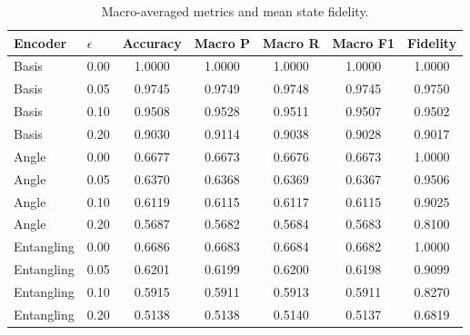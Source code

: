 \begin{table}[htbp]
\centering
\small
\caption{Macro-averaged metrics and mean state fidelity.}
\label{tab:macro}
\begin{tabular}{llccccc}
\toprule
Encoder & $\epsilon$ & Accuracy & Macro P & Macro R & Macro F1 & Fidelity \\
\midrule
Basis & 0.00 & 1.0000 & 1.0000 & 1.0000 & 1.0000 & 1.0000 \\
Basis & 0.05 & 0.9745 & 0.9749 & 0.9748 & 0.9745 & 0.9750 \\
Basis & 0.10 & 0.9508 & 0.9528 & 0.9511 & 0.9507 & 0.9502 \\
Basis & 0.20 & 0.9030 & 0.9114 & 0.9038 & 0.9028 & 0.9017 \\
\midrule
Angle & 0.00 & 0.6677 & 0.6673 & 0.6676 & 0.6673 & 1.0000 \\
Angle & 0.05 & 0.6370 & 0.6368 & 0.6369 & 0.6367 & 0.9506 \\
Angle & 0.10 & 0.6119 & 0.6115 & 0.6117 & 0.6115 & 0.9025 \\
Angle & 0.20 & 0.5687 & 0.5682 & 0.5684 & 0.5683 & 0.8100 \\
\midrule
Entangling & 0.00 & 0.6686 & 0.6683 & 0.6684 & 0.6682 & 1.0000 \\
Entangling & 0.05 & 0.6201 & 0.6199 & 0.6200 & 0.6198 & 0.9099 \\
Entangling & 0.10 & 0.5915 & 0.5911 & 0.5913 & 0.5911 & 0.8270 \\
Entangling & 0.20 & 0.5138 & 0.5138 & 0.5140 & 0.5137 & 0.6819 \\
\bottomrule
\end{tabular}
\end{table}
